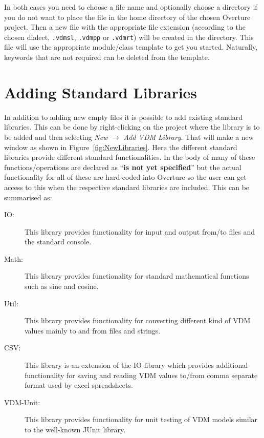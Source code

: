 \documentclass{overturerepchap}
\begin{document}
In both cases you need to choose a file name and optionally choose a
directory if you do not want to place the file in the home directory of
the chosen Overture project. Then a new file with the appropriate file
extension (according to the chosen dialect, \texttt{.vdmsl},
\texttt{.vdmpp} or \texttt{.vdmrt}) will be
created in the directory. This file will use the appropriate
module/class template to get you started. Naturally, keywords
that are not required can be deleted from the template.

\section{Adding Standard Libraries}

In addition to adding new empty files it is possible to add existing
standard libraries. This can be done by right-clicking on the project
where the library is to be added and then selecting \emph{New} $\rightarrow$
    \emph{Add VDM Library}. That will make a new window as shown in
    Figure~\ref{fig:NewLibraries}. Here the different standard
    libraries provide different standard functionalities. In the body
    of many of these functions/operations are declared as
    ``{\textbf{\ttfamily is not yet specified}}'' but the actual
    functionality for all of these are hard-coded into Overture so the
    user can get access to this when the respective standard libraries
    are included. This can be
    summarised as:

\begin{description}
\item[IO:] This library provides functionality for input and output
  from/to files and the standard console.
\item[Math:] This library provides functionality for standard
  mathematical functions such as sine and cosine.
\item[Util:] This library provides functionality for converting
  different kind of VDM values mainly to and from files and strings.
\item[CSV:] This library is an extension of the IO library which
  provides additional functionality for saving and reading VDM values
  to/from comma separate format used by excel spreadsheets.
\item[VDM-Unit:] This library provides functionality for unit testing
  of VDM models similar to the well-known JUnit library.
\end{description}
\end{document}
